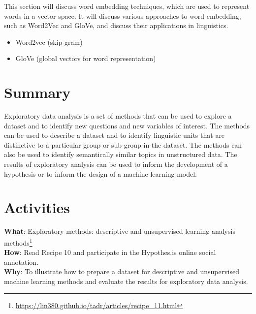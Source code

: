 \documentclass[
  letterpaper,
]{scrbook}
\providecommand{\tightlist}{%
  \setlength{\itemsep}{0pt}\setlength{\parskip}{0pt}}\usepackage{longtable,booktabs,array}
\DeclareRobustCommand{\href}[2]{#2\footnote{\url{#1}}}
\begin{document}
This section will discuss word embedding techniques, which are used to
represent words in a vector space. It will discuss various approaches to
word embedding, such as Word2Vec and GloVe, and discuss their
applications in linguistics.

\begin{itemize}
\tightlist
\item
  Word2vec (skip-gram)
\item
  GloVe (global vectors for word representation)
\end{itemize}

\hypertarget{summary-11}{%
\section{Summary}\label{summary-11}}

Exploratory data analysis is a set of methods that can be used to
explore a dataset and to identify new questions and new variables of
interest. The methods can be used to describe a dataset and to identify
linguistic units that are distinctive to a particular group or sub-group
in the dataset. The methods can also be used to identify semantically
similar topics in unstructured data. The results of exploratory analysis
can be used to inform the development of a hypothesis or to inform the
design of a machine learning model.

\hypertarget{activities-7}{%
\section*{Activities}\label{activities-7}}


\begin{tcolorbox}[enhanced jigsaw, title=\textcolor{quarto-callout-tip-color}{\faLightbulb}\hspace{0.5em}{Recipe}, breakable, colback=white, colframe=quarto-callout-tip-color-frame, bottomrule=.15mm, left=2mm, bottomtitle=1mm, colbacktitle=quarto-callout-tip-color!10!white, opacityback=0, arc=.35mm, toprule=.15mm, coltitle=black, leftrule=.75mm, opacitybacktitle=0.6, toptitle=1mm, titlerule=0mm, rightrule=.15mm]

\textbf{What}:
\href{https://lin380.github.io/tadr/articles/recipe_11.html}{Exploratory
methods: descriptive and unsupervised learning analysis methods}\\
\textbf{How}: Read Recipe 10 and participate in the Hypothes.is online
social annotation.\\
\textbf{Why}: To illustrate how to prepare a dataset for descriptive and
unsupervised machine learning methods and evaluate the results for
exploratory data analysis.

\end{tcolorbox}
\end{document}
